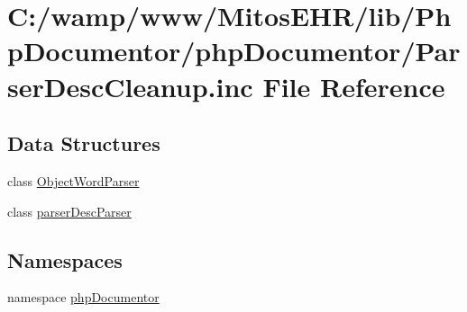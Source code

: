 \hypertarget{_parser_desc_cleanup_8inc}{\section{\-C\-:/wamp/www/\-Mitos\-E\-H\-R/lib/\-Php\-Documentor/php\-Documentor/\-Parser\-Desc\-Cleanup.inc \-File \-Reference}
\label{_parser_desc_cleanup_8inc}
}
\subsection*{\-Data \-Structures}
\begin{DoxyCompactItemize}
\item 
class \hyperlink{class_object_word_parser}{\-Object\-Word\-Parser}
\item 
class \hyperlink{classparser_desc_parser}{parser\-Desc\-Parser}
\end{DoxyCompactItemize}
\subsection*{\-Namespaces}
\begin{DoxyCompactItemize}
\item 
namespace \hyperlink{namespacephp_documentor}{php\-Documentor}
\end{DoxyCompactItemize}
